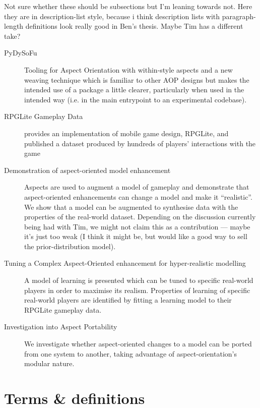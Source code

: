 Not sure whether these should be subsections but I'm leaning towards not. Here
they are in description-list style, because i think description lists with
paragraph-length definitions look really good in Ben's thesis. Maybe Tim has a
different take?

\begin{description}
  \item[PyDySoFu] Tooling for Aspect Orientation with within-style aspects and a
    new weaving technique which is familiar to other AOP designs but makes the
    intended use of a package a little clearer, particularly when used in the
    intended way (i.e. in the main entrypoint to an experimental codebase).
  \item[RPGLite Gameplay Data] provides an implementation of mobile game design,
    RPGLite, and published a dataset produced by hundreds of players'
    interactions with the game 
  \item[Demonstration of aspect-oriented model enhancement] Aspects are used to
    augment a model of gameplay and demonstrate that aspect-oriented
    enhancements can change a model and make it ``realistic''. We show that a
    model can be augmented to synthesise data with the properties of the
    real-world dataset. Depending on the discussion currently being had with
    Tim, we might not claim this as a contribution --- maybe it's just too weak
    (I think it might be, but would like a good way to sell the
    prior-distribution model).
  \item[Tuning a Complex Aspect-Oriented enhancement for hyper-realistic
    modelling] A model of learning is presented which can be tuned to specific
    real-world players in order to maximise its realism. Properties of learning
    of specific real-world players are identified by fitting a learning model to
    their RPGLite gameplay data.
  \item[Investigation into Aspect Portability] We investigate whether
    aspect-oriented changes to a model can be ported from one system to another,
    taking advantage of aspect-orientation's modular nature. 
\end{description}


\section{Terms \& definitions}\label{sec:glossary}


